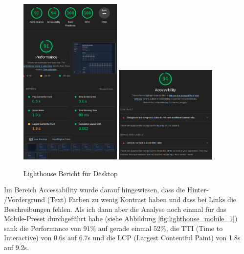 \begin{figure}[th]
    \centering
    \includegraphics[width=0.45\textwidth]{Figures/lighthouse_desktop_1.png}
    \includegraphics[width=0.45\textwidth]{Figures/lighthouse_desktop_2.png}
    \decoRule
    \caption[Turbomeet Lighthouse Bericht Desktop]{Lighthouse Bericht für Desktop}
    \label{fig:lighthouse_desktop_1}
\end{figure}

Im Bereich Accessability wurde darauf hingewiesen, dass die Hinter- /Vordergrund (Text) Farben zu wenig Kontrast haben und dass bei Links die Beschreibungen fehlen. Als ich dann aber die Analyse noch einmal für das Mobile-Preset durchgeführt habe (siehe Abbildung \ref{fig:lighthouse_mobile_1}) 
sank die Performance von 91\% auf gerade einmal 52\%, die TTI (Time to Interactive) von 0.6s auf 6.7s und die LCP (Largest Contentful Paint) von 1.8s auf 9.2s.

